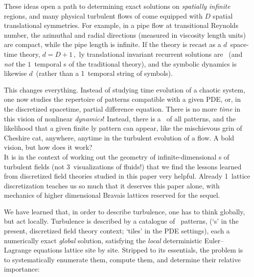 These ideas open a path to determining exact solutions on \emph{spatially
infinite} regions, and many physical turbulent flows of come equipped
with $D$ spatial translational symmetries. For example, in a pipe flow at
transitional Reynolds number, the azimuthal and radial directions
(measured in viscosity length units) are compact, while the pipe length
is infinite. If the theory is recast as a $d$\dmn\ space-time theory,
\(d= D +1\,,\)
{\spt}ly translational invariant recurrent solutions are \dtors\
(and \emph{not} the $1$\dmn\ temporal \po s of the traditional {\po} theory),
and the symbolic dynamics is likewise $d$\dmn\
(rather than a 1\dmn\ temporal string of symbols).

This changes everything. Instead of studying time evolution of a chaotic
system, one now studies the repertoire of {\spt} patterns compatible with
a given PDE, or, in the discretized spacetime, partial difference
equation. There is no more \emph{time} in this vision of nonlinear
\emph{dynamics}! Instead, there is a \statesp\ of all {\spt} patterns,
and the likelihood that a given finite {\spt}ly pattern can appear, like
the mischievous grin of Cheshire cat, anywhere, anytime in the turbulent
evolution of a flow. A bold vision, but how does it work?
\\

It is in the context of working out the geometry of infinite-dimensional
{\statesp}s of turbulent fields (not 3\dmn\ visualizations of
fluids!) that we find the lessons learned from discretized field
theories studied in this paper very helpful.
Already 1\dmn\ lattice discretization teaches us so much that it deserves
this paper alone, with mechanics of higher dimensional Bravais lattices
reserved for the sequel\rf{CL18}.

We have learned that, in order to describe turbulence, one has to think
globally, but act locally. Turbulence is described by a catalogue of
\spt\ patterns, ({`{\lattstate}s'} in the present, discretized field
theory context; `tiles' in the PDE settings\rf{CL18,GuBuCv17}), each a
numerically exact \emph{global} solution, satisfying the
\emph{local} deterministic Euler–Lagrange equations lattice site by site.
Stripped to its essentials, the problem is to systematically enumerate
them, compute them, and determine their relative importance:

